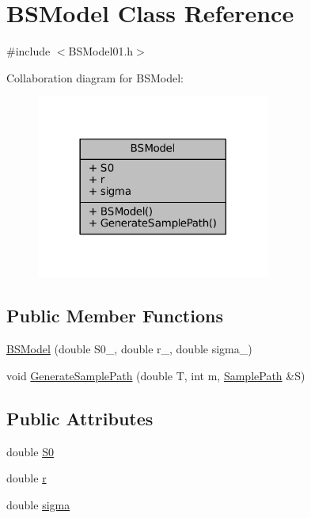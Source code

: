 \hypertarget{classBSModel}{\section{B\+S\+Model Class Reference}
\label{classBSModel}
}


{\ttfamily \#include $<$B\+S\+Model01.\+h$>$}



Collaboration diagram for B\+S\+Model\+:\nopagebreak
\begin{figure}[H]
\begin{center}
\leavevmode
\includegraphics[width=218pt]{classBSModel__coll__graph}
\end{center}
\end{figure}
\subsection*{Public Member Functions}
\begin{DoxyCompactItemize}
\item 
\hyperlink{classBSModel_a309dd895251cfd050b2d50a30abfc5fb}{B\+S\+Model} (double S0\+\_\+, double r\+\_\+, double sigma\+\_\+)
\item 
void \hyperlink{classBSModel_aad0f0d6d1b9df4d76d03bd0b477e1347}{Generate\+Sample\+Path} (double T, int m, \hyperlink{BSModel01_8h_afbb1a5715857075c187084894fc00d31}{Sample\+Path} \&S)
\end{DoxyCompactItemize}
\subsection*{Public Attributes}
\begin{DoxyCompactItemize}
\item 
double \hyperlink{classBSModel_a2b37a14d9aaab033d676dd16381f7f19}{S0}
\item 
double \hyperlink{classBSModel_add3230c0df8e47623116b439598c0de3}{r}
\item 
double \hyperlink{classBSModel_a1267641043c16cd9baf2eb242320f0d3}{sigma}
\end{DoxyCompactItemize}


